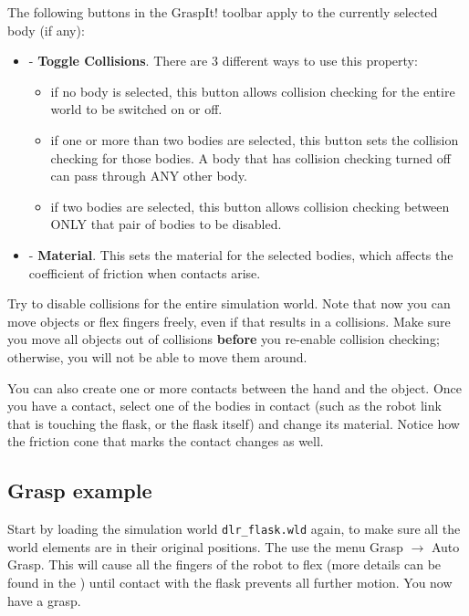The following buttons in the GraspIt! toolbar apply to the currently
selected body (if any):
\begin{itemize}
\item {} - \textbf{Toggle Collisions}. There are 3
  different ways to use this property:
\begin{itemize}
\item if no body is selected, this button allows collision checking
  for the entire world to be switched on or off.
\item if one or more than two bodies are selected, this button sets
  the collision checking for those bodies. A body that has collision
  checking turned off can pass through ANY other body.
\item if two bodies are selected, this button allows collision
  checking between ONLY that pair of bodies to be disabled.
\end{itemize}
\item {} - \textbf{Material}. This sets the
  material for the selected bodies, which affects the coefficient of
  friction when contacts arise.
\end{itemize}

Try to disable collisions for the entire simulation world. Note that
now you can move objects or flex fingers freely, even if that results
in a collisions. Make sure you move all objects out of collisions
\textbf{before} you re-enable collision checking; otherwise, you will
not be able to move them around.

You can also create one or more contacts between the hand and the
object. Once you have a contact, select one of the bodies in contact
(such as the robot link that is touching the flask, or the flask
itself) and change its material. Notice how the friction cone that
marks the contact changes as well.

\subsection{Grasp example}

Start by loading the simulation world \texttt{dlr\_flask.wld} again,
to make sure all the world elements are in their original
positions. The use the menu Grasp $\rightarrow$ Auto Grasp. This will cause all
the fingers of the robot to flex (more details can be found in the
) until contact with
the flask prevents all further motion. You now have a grasp.


